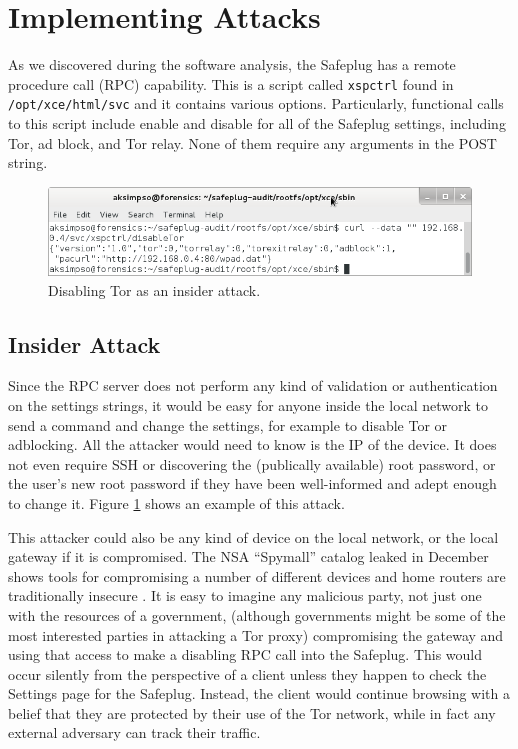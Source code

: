 \section{Implementing Attacks}
\label{sec:implementattacks}

As we discovered during the software analysis, the Safeplug has a remote procedure call (RPC) capability.  This is a script called \verb!xspctrl! found in \verb!/opt/xce/html/svc! and it contains various options.  Particularly, functional calls to this script include enable and disable for all of the Safeplug settings, including Tor, ad block, and Tor relay.  None of them require any arguments in the POST string.

\begin{figure}[htb]
\begin{center}
\includegraphics[width=.75\textwidth]{disabletor}
\caption{Disabling Tor as an insider attack.}
\label{disable}
\end{center}
\end{figure}

\subsection{Insider Attack}
Since the RPC server does not perform any kind of validation or authentication on the settings strings, it would be easy for anyone inside the local network to send a command and change the settings, for example to disable Tor or adblocking.  All the attacker would need to know is the IP of the device.  It does not even require SSH or discovering the (publically available) root password, or the user's new root password if they have been well-informed and adept enough to change it.  Figure \ref{disable} shows an example of this attack.

This attacker could also be any kind of device on the local network, or the local gateway if it is compromised.  The NSA ``Spymall'' catalog leaked in December shows tools for compromising a number of different devices and home routers are traditionally insecure \cite{spymall}.  It is easy to imagine any malicious party, not just one with the resources of a government, (although governments might be some of the most interested parties in attacking a Tor proxy) compromising the gateway and using that access to make a disabling RPC call into the Safeplug.  This would occur silently from the perspective of a client unless they happen to check the Settings page for the Safeplug.  Instead, the client would continue browsing with a belief that they are protected by their use of the Tor network, while in fact any external adversary can track their traffic.

